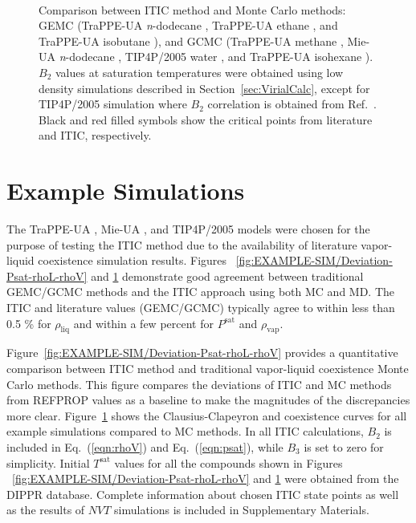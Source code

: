 \documentclass[5p,times]{elsarticle}
\begin{document}
\begin{figure}[]
\centering
{}\label{aa}
\label{bb}\\
\label{cc}
\label{dd}
\caption{
Comparison between ITIC method and Monte Carlo methods: GEMC (TraPPE-UA \textit{n}-dodecane \cite{Martin1998}, TraPPE-UA ethane \cite{Martin1998}, and TraPPE-UA isobutane \cite{Wick2000}), and GCMC (TraPPE-UA methane \cite{Shen2008}, Mie-UA \textit{n}-dodecane \cite{Potoff2009}, TIP4P/2005 water \cite{Shen2008}, and TraPPE-UA isohexane \cite{Mick2017}). $B_2$ values at saturation temperatures were obtained using low density simulations described in Section~\ref{sec:VirialCalc}, except for TIP4P/2005 simulation where $B_2$ correlation is obtained from Ref.~\cite{Benjamin2007,Chialvo2006}. Black and red filled symbols show the critical points from literature and ITIC, respectively.
}
\label{fig:EXAMPLE-SIM/all}
\end{figure}

\section{Example Simulations} \label{sec:ExampleSim}
The TraPPE-UA \cite{Martin1998,Martin1999,Wick2000}, Mie-UA \cite{Potoff2009,Mick2017,Barhaghi2017,Mick2015}, and TIP4P/2005 \cite{Abascal2005} models were chosen for the purpose of testing the ITIC method due to the availability of literature vapor-liquid coexistence simulation results. Figures ~\ref{fig:EXAMPLE-SIM/Deviation-Psat-rhoL-rhoV} and \ref{fig:EXAMPLE-SIM/all} demonstrate good agreement between traditional GEMC/GCMC methods and the ITIC approach using both MC and MD. The ITIC and literature values (GEMC/GCMC) typically agree to within less than 0.5 \% for $\rho_{\mathrm{liq}}$ and within a few percent for $P^\mathrm{sat}$ and $\rho_{\mathrm{vap}}$.

Figure~\ref{fig:EXAMPLE-SIM/Deviation-Psat-rhoL-rhoV} provides a quantitative comparison between ITIC method and traditional vapor-liquid coexistence Monte Carlo methods. This figure compares the deviations of ITIC and MC methods from REFPROP values as a baseline to make the magnitudes of the discrepancies more clear. Figure~\ref{fig:EXAMPLE-SIM/all} shows the Clausius-Clapeyron and coexistence curves for all example simulations compared to MC methods. In all ITIC calculations, $B_2$ is included in Eq.~(\ref{eqn:rhoV}) and Eq.~(\ref{eqn:psat}), while $B_3$ is set to zero for simplicity. Initial $T^\mathrm{sat}$ values for all the compounds shown in Figures ~\ref{fig:EXAMPLE-SIM/Deviation-Psat-rhoL-rhoV} and \ref{fig:EXAMPLE-SIM/all} were obtained from the DIPPR \cite{DIPPR2004} database. Complete information about chosen ITIC state points as well as the results of $NVT$ simulations is included in Supplementary Materials.
\end{document}
